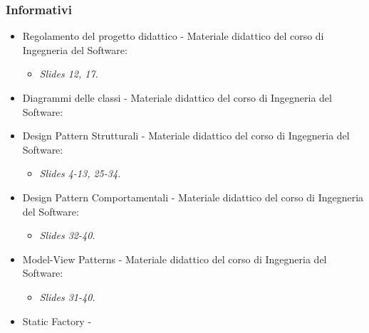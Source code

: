 \subsubsection{Informativi}
\begin{itemize}
\item Regolamento del progetto didattico - Materiale didattico del corso di Ingegneria del Software:
\newline {}
\begin{itemize}
\item \textit{Slides 12, 17.}
\end{itemize}
\item Diagrammi delle classi - Materiale didattico del corso di Ingegneria del Software:
\newline {}
\item Design Pattern Strutturali - Materiale didattico del corso di Ingegneria del Software:
\newline {}
\begin{itemize}
\item \textit{Slides 4-13, 25-34.}
\end{itemize}
\item Design Pattern Comportamentali - Materiale didattico del corso di Ingegneria del Software:
\newline {}
\begin{itemize}
\item \textit{Slides 32-40.}
\end{itemize}
\item Model-View Patterns - Materiale didattico del corso di Ingegneria del Software:
\newline {}
\begin{itemize}
\item \textit{Slides 31-40.}
\end{itemize}
\item Static Factory -
\newline {}
\end{itemize}
